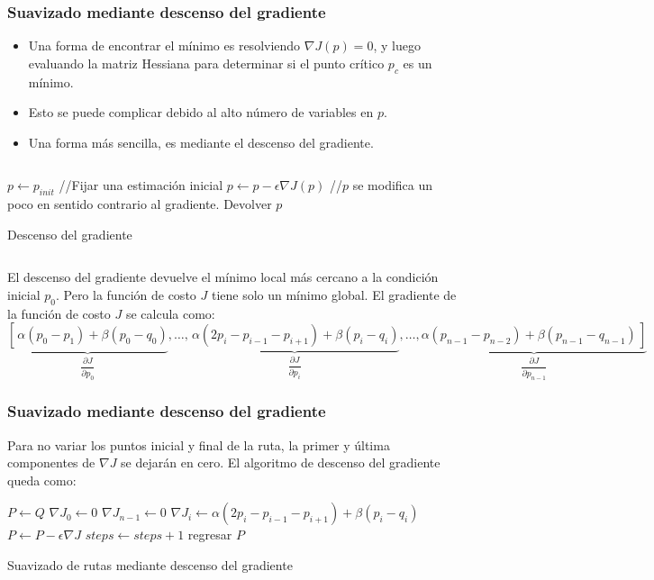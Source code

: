 \begin{frame}\frametitle{Suavizado mediante descenso del gradiente}
  \begin{itemize}
  \item Una forma de encontrar el mínimo es resolviendo $\nabla J(p) = 0$, y luego evaluando la matriz Hessiana para determinar si el punto crítico $p_c$ es un mínimo.
  \item Esto se puede complicar debido al alto número de variables en $p$.
  \item Una forma más sencilla, es mediante el descenso del gradiente.
  \end{itemize}
  \begin{columns}
    \begin{column}{0.7\textwidth}
  \begin{algorithm}[H]
    \footnotesize
  \DontPrintSemicolon
  $p\leftarrow p_{init}$ //Fijar una estimación inicial\;
  {
    $p \leftarrow p - \epsilon \nabla J (p)$ //$p$ se modifica un poco en sentido contrario al gradiente.\;
  }
  Devolver $p$
  \caption{Descenso del gradiente}
\end{algorithm}
\end{column}
\end{columns}
\[\]
El descenso del gradiente devuelve el mínimo local más cercano a la condición inicial $p_0$. Pero la función de costo $J$ tiene solo un mínimo global. El gradiente de la función de costo $J$ se calcula como:
  \[\underbrace{\left[\frac{}{}\alpha(p_0 - p_1)+\beta(p_0 - q_0)\right. }_{\dfrac{\partial J}{\partial p_0}}
,\dots ,
\underbrace{\frac{}{}\alpha(2p_i - p_{i-1} - p_{i+1})+\beta(p_i - q_i)}_{\dfrac{\partial J}{\partial p_i}}
,\dots ,
\underbrace{\left.\alpha(p_{n-1} - p_{n-2})+\beta(p_{n-1}-q_{n-1})\frac{}{}\right]}_{\dfrac{\partial J}{\partial p_{n-1}}}
\]
\end{frame}

\begin{frame}\frametitle{Suavizado mediante descenso del gradiente}
  
  Para no variar los puntos inicial y final de la ruta, la primer y última componentes de $\nabla J$ se dejarán en cero. El algoritmo de descenso del gradiente queda como:
  \[\]
\begin{algorithm}[H]
\DontPrintSemicolon
  \DontPrintSemicolon
  $P \leftarrow Q$\;
  $\nabla J_0 \leftarrow 0$\;
  $\nabla J_{n-1} \leftarrow 0$\;   
  {
    \ForEach{$i \in [1,n-1)$}
    {
      $\nabla J_i \leftarrow \alpha (2p_i - p_{i-1} - p_{i+1}) + \beta (p_i - q_i)$\;
    }
    $P \leftarrow P - \epsilon \nabla J$\;
    $steps \leftarrow steps + 1$
  }
  regresar $P$
  \caption{Suavizado de rutas mediante descenso del gradiente}
\end{algorithm}
\end{frame}

